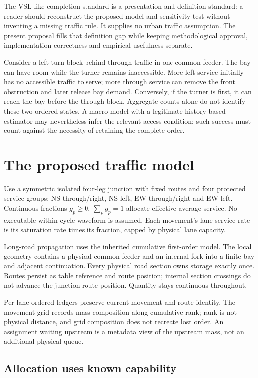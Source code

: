 \documentclass[11pt,a4paper]{article}
\begin{document}
The VSL-like completion standard is a presentation and definition standard:
a reader should reconstruct the proposed model and sensitivity test without
inventing a missing traffic rule. It supplies no urban traffic assumption.
The present proposal fills that definition gap while keeping methodological
approval, implementation correctness and empirical usefulness separate.

Consider a left-turn block behind through traffic in one common feeder.
The bay can have room while the turner remains inaccessible. More left
service initially has no accessible traffic to serve; more through service
can remove the front obstruction and later release bay demand. Conversely,
if the turner is first, it can reach the bay before the through block.
Aggregate counts alone do not identify these two ordered states. A macro
model with a legitimate history-based estimator may nevertheless infer the
relevant access condition; such success must count against the necessity
of retaining the complete order.

\section{The proposed traffic model}

Use a symmetric isolated four-leg junction with fixed routes and four
protected service groups: NS through/right, NS left, EW through/right and
EW left. Continuous fractions $g_p\geq0$, $\sum_pg_p=1$ allocate effective
average service. No executable within-cycle waveform is assumed. Each
movement's lane service rate is its saturation rate times its fraction,
capped by physical lane capacity.

Long-road propagation uses the inherited cumulative first-order model.
The local geometry contains a physical common feeder and an internal fork
into a finite bay and adjacent continuation. Every physical road section
owns storage exactly once. Routes persist as table reference and route
position; internal section crossings do not advance the junction route
position. Quantity stays continuous throughout.

Per-lane ordered ledgers preserve current movement and route identity.
The movement grid records mass composition along cumulative rank; rank is
not physical distance, and grid composition does not recreate lost order.
An assignment waiting upstream is a metadata view of the upstream mass,
not an additional physical queue.

\subsection*{Allocation uses known capability}
\end{document}

